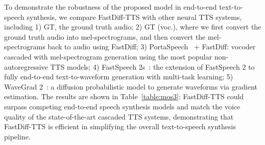 To demonstrate the robustness of the proposed model in end-to-end text-to-speech synthesis, we compare FastDiff-TTS with other neural TTS systems, including 1) GT, the ground truth audio; 2) GT (voc.), where we first convert the ground truth audio into mel-spectrograms, and then convert the mel-spectrograms back to audio using FastDiff; 3) PortaSpeech~\cite{ren2021portaspeech} + FastDiff: vocoder cascaded with mel-spectrogram generation using the most popular non-autoregressive TTS models; 4) FastSpeech 2s~\cite{ren2020fastspeech}: the extension of FastSpeech 2 to fully end-to-end text-to-waveform generation with multi-task learning; 5) WaveGrad 2~\cite{chen2021wavegrad}: a diffusion probabilistic model to generate waveforms via gradient estimation. The results are shown in Table~\ref{table:mos3}: FastDiff-TTS could surpass competing end-to-end speech synthesis models and match the voice quality of the state-of-the-art cascaded TTS systems, demonstrating that FastDiff-TTS is efficient in simplifying the overall text-to-speech synthesis pipeline.